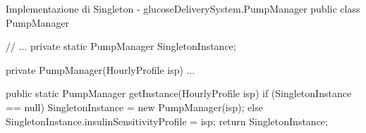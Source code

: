 \begin{javaCode}{Implementazione di Singleton - glucoseDeliverySystem.PumpManager}
public class PumpManager {
    // ...
    private static PumpManager SingletonInstance;

    private PumpManager(HourlyProfile isp) { ... }

    public static PumpManager getInstance(HourlyProfile isp) {
        if (SingletonInstance == null) {
            SingletonInstance = new PumpManager(isp);
        } else {
            SingletonInstance.insulinSensitivityProfile = isp;
        }
        return SingletonInstance;
    }
}
\end{javaCode}